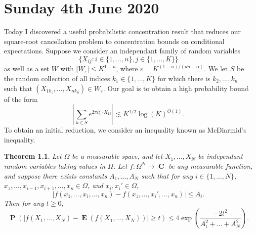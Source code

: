 \documentclass[openany,nobib,nols,a4paper,twoside,symmetric,justified,notoc]{tufte-book}
\theoremstyle{plain}
\newtheorem{theorem}{Theorem}[chapter]
\theoremstyle{remark}
\theoremstyle{definition}
\DeclareMathOperator{\CC}{\mathbf{C}}
\DeclareMathOperator{\EE}{\mathbf{E}}
\DeclareMathOperator{\PP}{\mathbf{P}}
\begin{document}
\chapter{Sunday 4th June 2020} \label{04062020}

Today I discovered a useful probabilistic concentration result that reduces our square-root cancellation problem to concentration bounds on conditional expectations. Suppose we consider an independant family of random variables
%
\[ \{ X_{ij}: i \in \{ 1, \dots, n \}, j \in \{ 1, \dots, K \} \} \]
%
as well as a set $W$ with $|W_\varepsilon| \leq K^{1-n}$, where $\varepsilon = K^{(1 - n)/(dn - \alpha)}$. We let $S$ be the random collection of all indices $k_1 \in \{ 1, \dots, K \}$ for which there is $k_2, \dots, k_n$ such that $(X_{1 k_1}, \dots, X_{nk_n}) \in W_\varepsilon$. Our goal is to obtain a high probability bound of the form
%
\[ \left| \sum_{k \in S} e^{2 \pi i \xi \cdot X_{1k}} \right| \lesssim K^{1/2} \log(K)^{O(1)}. \]
%
To obtain an initial reduction, we consider an inequality known as McDiarmid's inequality.

\begin{theorem}
    Let $\Omega$ be a measurable space, and let $X_1, \dots, X_N$ be independant random variables taking values in $\Omega$. Let $f: \Omega^N \to \CC$ be any measurable function, and suppose there exists constants $A_1, \dots, A_N$ such that for any $i \in \{ 1, \dots, N \}$, $x_1, \dots, x_{i-1}, x_{i+1}, \dots, x_n \in \Omega$, and $x_i, x_i' \in \Omega$,
    \[ |f(x_1,\dots,x_i,\dots,x_n) - f(x_1,\dots,x_i',\dots,x_n)| \leq A_i. \]
    Then for any $t \geq 0$,
    \[ \PP \left( |f(X_1,\dots,X_N) - \EE(f(X_1,\dots,X_N))| \geq t \right) \leq 4 \exp \left( \frac{-2t^2}{A_1^2 + \dots + A_N^2} \right). \]
\end{theorem}
\end{document}
